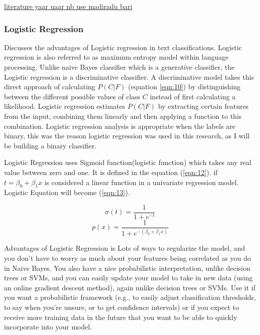 \underline{literature yaar uaar nb use madiradu bari} 

\subsubsection{Logistic Regression}

\cite{ManDaniel} Discusses the advantages of Logistic regression in text classifications. Logistic regression is also referred to as maximum entropy model within language processing. Unlike naive Bayes classifier which is a generative classifier, the Logistic regression is a discriminative classifier. A discriminative model takes this direct approach of calculating $P(C|F)$ (equation \ref{eqn:10}) by distinguishing between the different possible values of class $C$ instead of first calculating a likelihood. Logistic regression estimates $P(C|F)$ by extracting certain features from the input, combining them linearly and then applying a function to this combination. Logistic regression analysis is appropriate when the labels are binary, this was the reason logistic regression was used in this research, as I will be building a binary classifier. 

Logistic Regression uses Sigmoid function(logistic function) which takes any real value between zero and one. It is defined in the equation (\ref{eqn:12}). if $t= \beta_0 + \beta_1x$ is considered a linear function in a univariate regression model. Logistic Equation will become (\ref{eqn:13}). 




\begin{equation}
\label{eqn:12}
\sigma(t) = \frac{1}{1+e^{-t}}
\end{equation}
\begin{equation}
\label{eqn:13}
p(x) = \frac{1}{1 + e^{-(\beta_0 + \beta_1x)}}
\end{equation}



Advantages of Logistic Regression is Lots of ways to regularize the model, and you don’t have to worry as much about your features being correlated as you do in Naive Bayes. You also have a nice probabilistic interpretation, unlike decision trees or SVMs, and you can easily update your model to take in new data (using an online gradient descent method), again unlike decision trees or SVMs. Use it if you want a probabilistic framework (e.g., to easily adjust classification thresholds, to say when you’re unsure, or to get confidence intervals) or if you expect to receive more training data in the future that you want to be able to quickly incorporate into your model.

